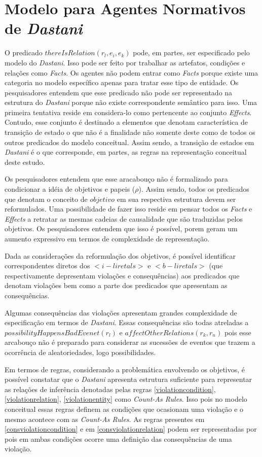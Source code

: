 \section{Modelo para Agentes Normativos de \textit{Dastani}}

O predicado $thereIsRelation(r_l,e_i,e_k)$ pode, em partes, ser especificado pelo modelo do \textit{Dastani}. Isso pode ser feito por trabalhar as artefatos, condições e relações como \textit{Facts}. Os agentes não podem entrar como \textit{Facts} porque existe uma categoria no modelo específico apenas para tratar esse tipo de entidade. Os pesquisadores entendem que esse predicado não pode ser representado na estrutura do \textit{Dastani} porque não existe correspondente semântico para isso. Uma primeira tentativa reside em considera-lo como pertencente ao conjunto \textit{Effects}. Contudo, esse conjunto é destinado a elementos que denotam característica 
de transição de estado o que não é a finalidade não somente deste como de todos os outros predicados do modelo conceitual. Assim sendo, a transição de estados em  \textit{Dastani} é o que corresponde, em partes, as regras na representação conceitual deste estudo. 

Os pesquisadores entendem que esse aracabouço não é formalizado para condicionar a idéia de objetivos e papeis ($\rho$). Assim sendo, todos os predicados que denotam o conceito de $objetivo$ em sua respectiva estrutura devem ser reformulados. Uma possibilidade de fazer isso reside em pensar todos os \textit{Facts} e \textit{Effects} a retratar as mesmas cadeias de causalidade que são traduzidas pelos objetivos. Os pesquisadores entendem que isso é possível, porem geram um aumento expressivo em termos de complexidade de representação. 

Dada as considerações da reformulação dos objetivos, é possível identificar correspondentes diretos dos $<i-liretals>$  e $<b-liretals>$ (que respectivamente depresentam violações e consequências) aos predicados que denotam violações bem como a parte dos predicados que apresentam as consequências. 

Algumas consequências das violações apresentam grandes complexidade de especificação em termos de \textit{Dastani}. Essas consequências são todas atreladas a $possibilityHappensBadEvenet(r_l)$ e $affectOtherRelations(r_k,r_n)$ pois esse arcabouço não é preparado para considerar as sucessões de eventos que trazem a ocorrência de aleatoriedades, logo possibilidades. 

Em termos de regras, considerando a problemática envolvendo os objetivos, é possível constatar que o \textit{Dastani} apresenta estrutura suficiente para representar as relações de inferência denotadas pelas regras \ref{violationcondition}, \ref{violationrelation}, \ref{violationentity} como \textit{Count-As Rules}. Isso pois no modelo conceitual essas regras definem as condições que ocasionam uma violação e o mesmo acontece com as \textit{Count-As Rules}. As regras presentes em \ref{consviolationcondition} e em \ref{consviolationrelation} podem ser representadas por  pois em ambas condições ocorre uma definição das consequências de uma violação. 